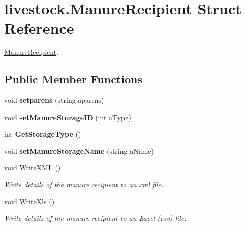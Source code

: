 \hypertarget{structlivestock_1_1_manure_recipient}{}\section{livestock.\+Manure\+Recipient Struct Reference}
\label{structlivestock_1_1_manure_recipient}


\mbox{\hyperlink{structlivestock_1_1_manure_recipient}{Manure\+Recipient}}.  


\subsection*{Public Member Functions}
\begin{DoxyCompactItemize}
\item 
\mbox{\label{structlivestock_1_1_manure_recipient_a1a0d58eb3ea8b605c54689dfeff011d8}} 
void {\bfseries setparens} (string aparens)
\item 
\mbox{\label{structlivestock_1_1_manure_recipient_ad0d4cbec67fa194f399bb833d2cbc245}} 
void {\bfseries set\+Manure\+Storage\+ID} (int a\+Type)
\item 
\mbox{\label{structlivestock_1_1_manure_recipient_a0c22336e1afb2d95c77579e6058c3eb4}} 
int {\bfseries Get\+Storage\+Type} ()
\item 
\mbox{\label{structlivestock_1_1_manure_recipient_a6ed29ef9379457b3add6d3c2e9d6bf62}} 
void {\bfseries set\+Manure\+Storage\+Name} (string a\+Name)
\item 
\mbox{\label{structlivestock_1_1_manure_recipient_ab93d856ae7ab6bc3eb1911d7fc3e6167}} 
void \mbox{\hyperlink{structlivestock_1_1_manure_recipient_ab93d856ae7ab6bc3eb1911d7fc3e6167}{Write\+X\+ML}} ()
\begin{DoxyCompactList}\small\item\em Write details of the manure recipient to an xml file. \end{DoxyCompactList}\item 
\mbox{\label{structlivestock_1_1_manure_recipient_a315089a601963280da32e84aca9bfb7c}} 
void \mbox{\hyperlink{structlivestock_1_1_manure_recipient_a315089a601963280da32e84aca9bfb7c}{Write\+Xls}} ()
\begin{DoxyCompactList}\small\item\em Write details of the manure recipient to an Excel (csv) file. \end{DoxyCompactList}\end{DoxyCompactItemize}
